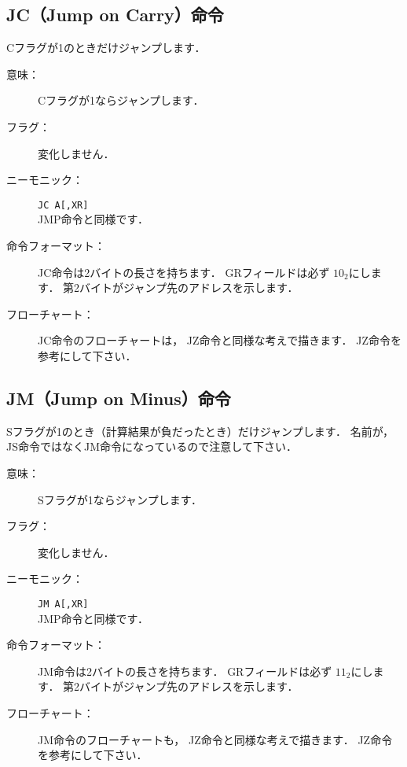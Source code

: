 \newpage
\subsection{JC（Jump on Carry）命令}
Cフラグが1のときだけジャンプします．

\begin{description}
\item[意味：]Cフラグが1ならジャンプします．
\item[フラグ：]変化しません．
\item[ニーモニック：]{\tt JC  A[,XR]} \\
JMP命令と同様です．
\item[命令フォーマット：]JC命令は2バイトの長さを持ちます．
GRフィールドは必ず $10_2$にします．
第2バイトがジャンプ先のアドレスを示します．


\item[フローチャート：]JC命令のフローチャートは，
JZ命令と同様な考えで描きます．
JZ命令を参考にして下さい．

\end{description}

\subsection{JM（Jump on Minus）命令}
Sフラグが1のとき（計算結果が負だったとき）だけジャンプします．
名前が，JS命令ではなくJM命令になっているので注意して下さい．

\begin{description}
\item[意味：]Sフラグが1ならジャンプします．

\item[フラグ：]変化しません．

\item[ニーモニック：]{\tt JM  A[,XR]} \\
JMP命令と同様です．

\item[命令フォーマット：]JM命令は2バイトの長さを持ちます．
GRフィールドは必ず $11_2$にします．
第2バイトがジャンプ先のアドレスを示します．


\item[フローチャート：]JM命令のフローチャートも，
JZ命令と同様な考えで描きます．
JZ命令を参考にして下さい．
\end{description}

